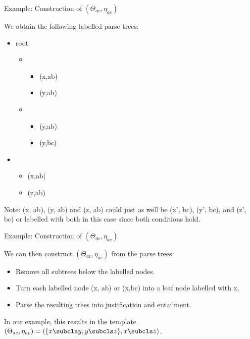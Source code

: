 \documentclass{beamer}
\begin{document}
\begin{frame}{Example: Construction of $(\Theta_{ac}, \eta_{ac})$}

We obtain the following labelled parse trees:
\begin{itemize}
\item root
\begin{itemize}
\item \subcls
\begin{itemize}
\item (x,ab)
\item (y,ab)
\end{itemize}
\item \subcls
\begin{itemize}
\item (y,ab)
\item (y,bc)
\end{itemize}
\end{itemize}
\end{itemize}

\begin{itemize}
\item \subcls
\begin{itemize}
\item (x,ab)
\item (z,ab)
\end{itemize}
\end{itemize}

Note: (x, ab), (y, ab) and (z, ab) could just as well be (x', bc), (y', bc), and (z', bc) or labelled with both in this case since both conditions hold.

\end{frame}

\begin{frame}{Example: Construction of $(\Theta_{ac}, \eta_{ac})$}

We can then construct $(\Theta_{ac}, \eta_{ac})$ from the parse trees:
\begin{itemize}
\item Remove all subtrees below the labelled nodes.
\item Turn each labelled node (x, ab) or (x,bc) into a leaf node labelled with x.
\item Parse the resulting trees into justification and entailment.
\end{itemize}

In our example, this results in the template $(\Theta_{ac}, \eta_{ac}) = ( \{ x \subcls y, y \subcls z \}, x \subcls z)$.
\end{frame}
\end{document}
